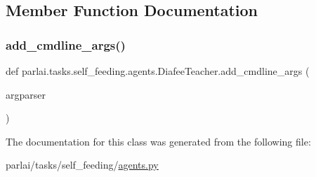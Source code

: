 \subsection{Member Function Documentation}
\mbox{\label{classparlai_1_1tasks_1_1self__feeding_1_1agents_1_1DiafeeTeacher_aab781156a05d1046b153df4920d4ce6b}} 
\subsubsection{\texorpdfstring{add\+\_\+cmdline\+\_\+args()}{add\_cmdline\_args()}}
{\footnotesize\ttfamily def parlai.\+tasks.\+self\+\_\+feeding.\+agents.\+Diafee\+Teacher.\+add\+\_\+cmdline\+\_\+args (\begin{DoxyParamCaption}\item[{}]{argparser }\end{DoxyParamCaption})\hspace{0.3cm}{\ttfamily [static]}}



The documentation for this class was generated from the following file\+:\begin{DoxyCompactItemize}
\item 
parlai/tasks/self\+\_\+feeding/\hyperlink{parlai_2tasks_2self__feeding_2agents_8py}{agents.\+py}\end{DoxyCompactItemize}
